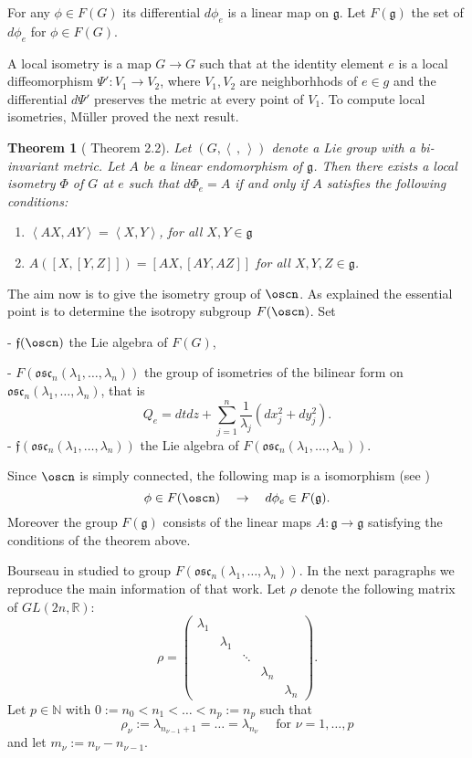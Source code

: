 \documentclass[12pt]{amsart}
\newcommand{\lela}{\left \langle}
\newcommand{\rira}{\right \rangle}
\newcommand{\mgg}{\mathfrak g}
\theoremstyle{plain}
\newtheorem{thm}{Theorem}[section]
\theoremstyle{definition}
\theoremstyle{remark}
\begin{document}
    For any $\phi\in F(G)$ its differential $d\phi_e$ is a linear map on $\mathfrak g$. Let $F(\mathfrak g)$ the set of $d\phi_e$ for  $\phi \in F(G)$.
    
    
    A local isometry  is  a map $G\to G$ such that  at the identity element  $e$ is a local  diffeomorphism $\Psi':V_1 \to V_2$, where $V_1, V_2$ are neighborhhods of $e\in g$ and the  differential $d\Psi'$ preserves the metric at every point of $V_1$.  To compute local isometries, M\"uller proved the next result.

    \begin{thm}[\cite{MU} Theorem 2.2] 
    Let $(G, \lela\,,\,\rira)$ denote a Lie group with a bi-invariant metric.     Let $A$ be a linear endomorphism of $\mgg$. Then there exists a local isometry $\Phi$ of $G$ at $e$ such that $d \Phi_e = A$ if and only if $A$ satisfies the following conditions:
        \begin{enumerate}
            \item $\lela AX, AY \rira = \lela X, Y \rira$, for all   $X,Y \in \mgg$
            \item $A([X,[Y,Z]]) = [AX,[AY,AZ]]$ for all $X,Y,Z \in \mgg$.
        \end{enumerate}
        
    \end{thm}

The aim now is to give the isometry group of $\oscn$. As explained the essential point is to determine the isotropy subgroup $F(\oscn)$. Set 

- $\mathfrak f(\oscn)$ the Lie algebra of $F(G)$,

- $F(\mathfrak{osc}_n(\lambda_1, \hdots, \lambda_n))$ the group of isometries of the bilinear form on $\mathfrak{osc}_n(\lambda_1, \hdots, \lambda_n)$, that is 
$$Q_e = dtdz + \sum_{j=1}^n \frac{1}{\lambda_j}(dx_j^2 + dy_j^2).$$
- $\mathfrak f(\mathfrak{osc}_n(\lambda_1, \hdots, \lambda_n))$ the Lie algebra of $F(\mathfrak{osc}_n(\lambda_1, \hdots, \lambda_n))$. 

Since $\oscn$ is simply connected, the following map is a isomorphism (see \cite{MU})
$$\phi \in F(\oscn) \quad \to \quad d\phi_e\in F(\mathfrak g).$$
Moreover the group $F(\mathfrak g)$ consists of the linear maps $A:\mathfrak g\to \mathfrak g$ satisfying the conditions of the theorem above. 

Bourseau in \cite{Bou} studied to group $F(\mathfrak{osc}_n(\lambda_1, \hdots, \lambda_n))$. In the next paragraphs we reproduce the main  information of that work. Let $\rho$ denote the following matrix of $GL(2n, \mathbb R)$:
$$ \rho = \left( 
\begin{matrix} 
\lambda_1 & & & & \\
& \lambda_1 &   & &\\
& & \ddots & & \\
& & & \lambda_n & \\
& & & & \lambda_n
\end{matrix}\right).$$
Let $p\in \mathbb N$ with $0:=n_0 < n_1 < \hdots < n_p:=n_p$ such that
$$\rho_{\nu}:=\lambda_{n_{\nu - 1}+ 1}= \hdots = \lambda_{n_{\nu}}\quad \mbox{ for } \nu=1, \hdots, p$$ and let $m_{\nu}:=n_{\nu}- n_{{\nu}-1}$. 
    
\end{document}
